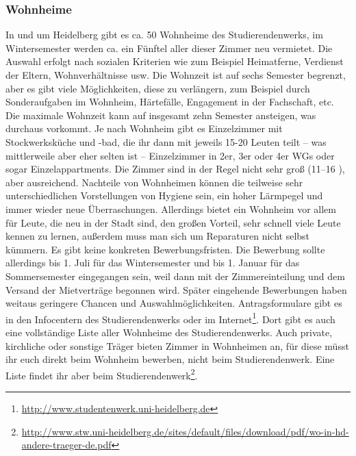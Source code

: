 \subsubsection{Wohnheime}


In und um Heidelberg gibt es ca. 50 Wohnheime des Studierendenwerks, im Wintersemester werden ca. ein Fünftel aller dieser Zimmer neu vermietet. Die Auswahl erfolgt nach sozialen Kriterien wie zum Beispiel Heimatferne, Verdienst der Eltern, Wohnverhältnisse usw. Die Wohnzeit ist auf sechs Semester begrenzt, aber es gibt viele Möglichkeiten, diese zu verlängern, zum Beispiel durch Sonderaufgaben im Wohnheim, Härtefälle, Engagement in der Fachschaft, etc. Die maximale Wohnzeit kann auf insgesamt zehn Semester ansteigen, was durchaus vorkommt. Je nach Wohnheim gibt es Einzelzimmer mit Stockwerksküche und -bad, die ihr dann mit jeweils 15-20 Leuten teilt -- was mittlerweile aber eher selten ist -- Einzelzimmer in 2er, 3er oder 4er WGs oder sogar Einzelappartments. Die Zimmer sind in der Regel nicht sehr groß (11--16 \squaren\metre), aber ausreichend. Nachteile von Wohnheimen können die teilweise sehr unterschiedlichen Vorstellungen von Hygiene sein, ein hoher Lärmpegel und immer wieder neue Überraschungen. Allerdings bietet ein Wohnheim vor allem für Leute, die neu in der Stadt sind, den großen Vorteil, sehr schnell viele Leute kennen zu lernen, außerdem muss man sich um Reparaturen nicht selbst kümmern. Es gibt keine konkreten Bewerbungsfristen. Die Bewerbung sollte allerdings bis 1. Juli für das Wintersemester und bis 1. Januar für das Sommersemester eingegangen sein, weil dann mit der Zimmereinteilung und dem Versand der Mietverträge begonnen wird. Später eingehende Bewerbungen haben weitaus geringere Chancen und Auswahlmöglichkeiten. Antragsformulare gibt es in den Infocentern des Studierendenwerks oder im Internet\footnote{\url{http://www.studentenwerk.uni-heidelberg.de}}. Dort gibt es auch eine vollständige Liste aller Wohnheime des Studierendenwerks. Auch private, kirchliche oder sonstige Träger bieten Zimmer in Wohnheimen an, für diese müsst ihr euch direkt beim Wohnheim bewerben, nicht beim Studierendenwerk. Eine Liste findet ihr aber beim Studierendenwerk\footnote{\url{http://www.stw.uni-heidelberg.de/sites/default/files/download/pdf/wo-in-hd-andere-traeger-de.pdf}}.
